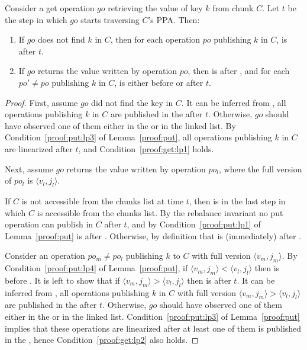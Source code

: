 \begin{lemma}
\label{proof:get}
Consider a get operation $go$ retrieving the value of key $k$ from chunk $C$. Let $t$ be the step in which $go$ starts traversing $C$'s {PPA}. Then:
\begin{enumerate}
\setlength{\itemsep}{0pt}
\setlength{\parskip}{0pt}
\item \label{proof:get:lp1} If $go$ does not find $k$ in $C$, then for each operation $po$ publishing $k$ in $C$,  is after $t$.
\item \label{proof:get:lp2} If $go$ returns the value written by operation $po$, then  is after , and for each  $po' \neq po$ publishing $k$ in $C$,  is either before  or after $t$.
\end{enumerate}
\end{lemma}
\begin{proof}

First, assume $go$ did not find the key in $C$. It can be inferred from , all operations publishing $k$ in $C$ are published in the  after $t$. Otherwise, $go$ should have observed one of them either in the  or in the linked list. By Condition~\ref{proof:put:lp3} of Lemma~\ref{proof:put}, all operations publishing $k$ in $C$ are linearized after $t$, and Condition~\ref{proof:get:lp1} holds.

Next, assume $go$ returns the value written by operation $po_l$, where the full version of $po_l$ is $\langle v_l, j_l\rangle$. 

If $C$ is not accessible from the chunks list at time $t$, then  is in the last step in which $C$ is accessible from the chunks list. By the rebalance invariant no put operation can publish in $C$ after $t$, and by Condition~\ref{proof:put:lp1} of Lemma~\ref{proof:put}   is after . Otherwise, by definition that  is (immediately) after  .

Consider an operation $po_m \neq po_l$ publishing $k$ to $C$ with full version $\langle v_m, j_m\rangle$.
By Condition~\ref{proof:put:lp4} of Lemma~\ref{proof:put}, if $\langle v_m, j_m\rangle < \langle v_l, j_l\rangle$ then  is before . It is left to show that if $\langle v_m, j_m\rangle > \langle v_l, j_l\rangle$ then  is after $t$.
It can be inferred from , all operations publishing $k$ in $C$ with full version $\langle v_m, j_m\rangle > \langle v_l, j_l\rangle$ are published in the  after $t$. Otherwise, $go$ should have observed one of them either in the  or in the linked list.
Condition~\ref{proof:put:lp3} of Lemma~\ref{proof:put} implies that these operations are linearized after at least one of them is published in the , hence Condition~\ref{proof:get:lp2} also holds.
\end{proof}

